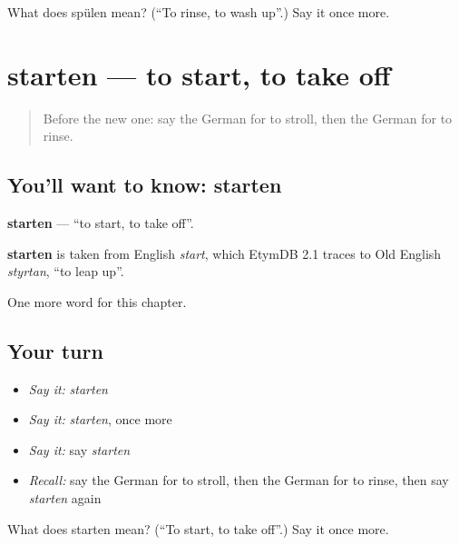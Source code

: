 \begin{tcolorbox}[breakable,colback=teal!4,colframe=teal!35!black,title={Before you move on}]
What does spülen mean? (\textquotedblleft{}To rinse, to wash up\textquotedblright{}.) Say it once more.
\end{tcolorbox}
\section[starten]{starten — to start, to take off}

\label{lesson:GE-C187-starten}



\begin{quote}
Before the new one: say the German for to stroll, then the German for to rinse.
\end{quote}

\subsection*{You'll want to know: starten}
\textbf{starten} — \textquotedblleft{}to start, to take off\textquotedblright{}.

\begin{cousinweb}
\textbf{starten} is taken from English \emph{start}, which EtymDB 2.1 traces to Old English \emph{styrtan}, \textquotedblleft{}to leap up\textquotedblright{}.
\end{cousinweb}

\begin{grammarlens}[title={What you've built}]
One more word for this chapter.
\end{grammarlens}

\subsection*{Your turn}
\begin{itemize}
\raggedright
  \item \emph{Say it:} \emph{starten}
  \item \emph{Say it:} \emph{starten}, once more
  \item \emph{Say it:} say \emph{starten}
  \item \emph{Recall:} say the German for to stroll, then the German for to rinse, then say \emph{starten} again
\end{itemize}

\begin{tcolorbox}[breakable,colback=teal!4,colframe=teal!35!black,title={Before you move on}]
What does starten mean? (\textquotedblleft{}To start, to take off\textquotedblright{}.) Say it once more.
\end{tcolorbox}
